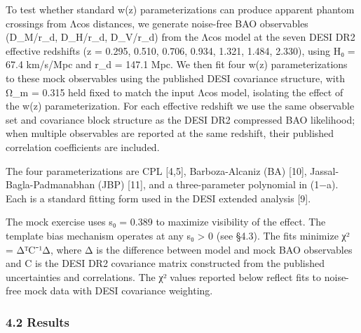 To test whether standard w(z) parameterizations can produce apparent
phantom crossings from Λcos distances, we generate noise-free BAO
observables (D\_M/r\_d, D\_H/r\_d, D\_V/r\_d) from the Λcos model at the
seven DESI DR2 effective redshifts (z = 0.295, 0.510, 0.706, 0.934,
1.321, 1.484, 2.330), using H₀ = 67.4 km/s/Mpc and r\_d = 147.1 Mpc. We
then fit four w(z) parameterizations to these mock observables using the
published DESI covariance structure, with Ω\_m = 0.315 held fixed to
match the input Λcos model, isolating the effect of the w(z)
parameterization. For each effective redshift we use the same observable
set and covariance block structure as the DESI DR2 compressed BAO
likelihood; when multiple observables are reported at the same redshift,
their published correlation coefficients are included.

The four parameterizations are CPL {[}4,5{]}, Barboza-Alcaniz (BA)
{[}10{]}, Jassal-Bagla-Padmanabhan (JBP) {[}11{]}, and a three-parameter
polynomial in (1−a). Each is a standard fitting form used in the DESI
extended analysis {[}9{]}.

The mock exercise uses s₀ = 0.389 to maximize visibility of the effect.
The template bias mechanism operates at any s₀ \textgreater{} 0 (see
§4.3). The fits minimize χ² = ΔᵀC⁻¹Δ, where Δ is the difference between
model and mock BAO observables and C is the DESI DR2 covariance matrix
constructed from the published uncertainties and correlations. The χ²
values reported below reflect fits to noise-free mock data with DESI
covariance weighting.

\subsubsection{4.2 Results}\label{results}

